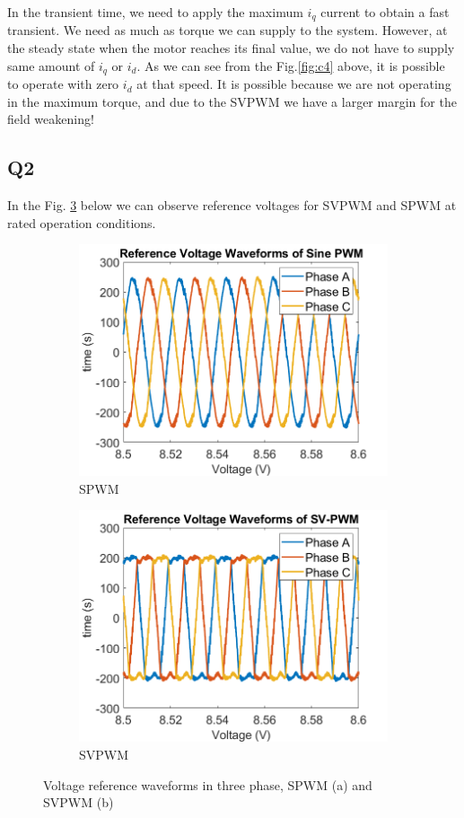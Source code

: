 In the transient time, we need to apply the maximum $i_q$ current to obtain a fast transient. We need as much as torque we can supply to the system. However, at the steady state when the motor reaches its final value, we do not have to supply same amount of  $i_q$ or $i_d$. As we can see from the Fig.\ref{fig:c4} above, it is possible to operate with zero $i_d$ at that speed. It is possible because we are not operating in the maximum torque, and due to the SVPWM we have a larger margin for the field weakening!

\subsection{Q2}

In the Fig. \ref{fig:vref} below we can observe reference voltages for SVPWM and SPWM at rated operation conditions.

\begin{figure}[H]
        \centering
        \begin{subfigure}[b]{0.475\textwidth}
            \centering
            \includegraphics[width = 8 cm]{figs/sine_ref.png}
            \caption{SPWM}
            \label{fig:ref1}
        \end{subfigure}
        \hfill
        \begin{subfigure}[b]{0.475\textwidth}  
            \centering 
            \includegraphics[width = 8 cm]{figs/svpwm_ref.png}
            \caption{SVPWM}
            \label{fig:ref2}
        \end{subfigure}
        \caption{Voltage reference waveforms in three phase, SPWM (a) and SVPWM (b)}
        \label{fig:vref}
        \end{figure}  


